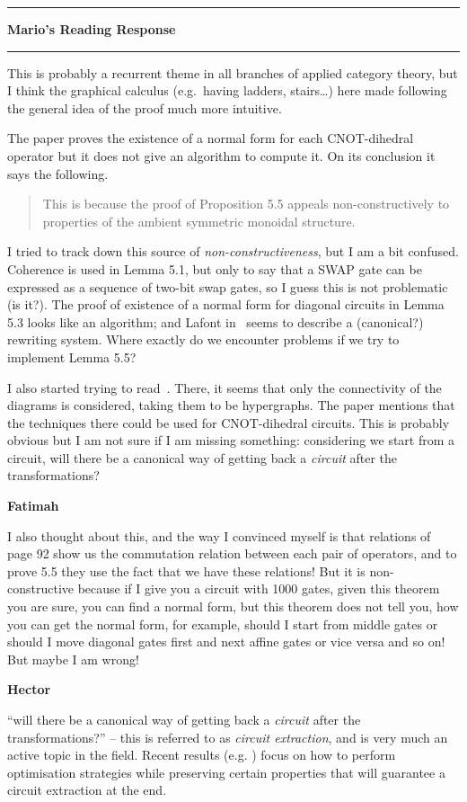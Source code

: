 \documentclass{amsart}
\newcommand{\iam}[1]{
  \vspace{0.25em}
  \hrule
  \vspace{0.25em}
  \textbf{{#1}'s Reading Response}
  \vspace{0.25em}
  \hrule
  \vspace{1em}
}
\newcommand{\respond}[1]{
  \vspace{1em} \textbf{#1}
}
\begin{document}
\iam{Mario}
This is probably a recurrent theme in all branches of applied category
theory, but I think the graphical calculus (e.g.\ having ladders, stairs\ldots)
here made following the general idea of the proof much more intuitive.

The paper proves the existence of a normal form for each CNOT-dihedral
operator but it does not give an algorithm to compute it. On its
conclusion it says the following.
\begin{quotation}
  This is because the proof of Proposition 5.5 appeals
  non-constructively to properties of the ambient symmetric monoidal
  structure.
\end{quotation}
I tried to track down this source of
\textit{non-constructiveness}, but I am a
bit confused. Coherence is used in Lemma 5.1, but only to say that a
SWAP gate can be expressed as a sequence of two-bit swap gates, so I
guess this is not problematic (is it?).  The proof of existence of a normal
form for diagonal circuits in Lemma 5.3 looks like an algorithm; and
Lafont in~\cite{LafontBooleanCircuits} seems to describe a
(canonical?) rewriting system.  Where exactly do we encounter
problems if we try to implement Lemma 5.5?

I also started trying to read~\cite{RewritingSMC}. There, it seems
that only the connectivity of the diagrams is considered, taking them
to be hypergraphs.  The paper mentions that the techniques there could
be used for CNOT-dihedral circuits.  This is probably obvious but I am
not sure if I am missing something: considering we start from a
circuit, will there be a canonical way of getting back a
\textit{circuit} after the transformations?

\respond{Fatimah}
I also thought about this, and the way I convinced myself is that relations of page 92 show us the commutation relation between each pair of operators, and to prove 5.5 they use the fact that we have these relations! But it is non-constructive because if I give you a circuit with 1000 gates, given this theorem you are sure, you can find a normal form, but this theorem does not tell you, how you can get the normal form, for example, should I start from middle gates or should I move diagonal gates first and next affine gates or vice versa and so on!
But maybe I am wrong!

\respond{Hector}
``will there be a canonical way of getting back a
\textit{circuit} after the transformations?'' -- this is referred to as \emph{circuit extraction},
and is very much an active topic in the field.
Recent results (e.g. \cite{Duncan19})
focus on how to perform optimisation strategies while preserving
certain properties that will guarantee a circuit extraction at the end.
\end{document}
